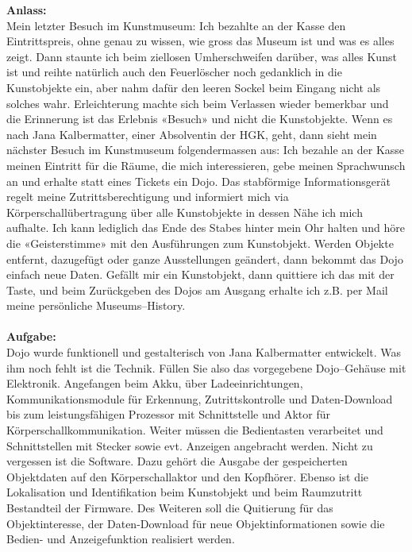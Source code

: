 \documentclass[10pt,a4paper,oneside]{99_fhnwreport}
\begin{document}
\textbf{Anlass:}\\
Mein letzter Besuch im Kunstmuseum: Ich bezahlte an der Kasse den
Eintrittspreis, ohne genau zu wissen, wie gross das Museum ist und was es alles zeigt. Dann
staunte ich beim ziellosen Umherschweifen darüber, was alles Kunst ist und reihte natürlich
auch den Feuerlöscher noch gedanklich in die Kunstobjekte ein, aber nahm dafür den leeren
Sockel beim Eingang nicht als solches wahr. Erleichterung machte sich beim Verlassen wieder
bemerkbar und die Erinnerung ist das Erlebnis «Besuch» und nicht die Kunstobjekte.
Wenn es nach Jana Kalbermatter, einer Absolventin der HGK, geht, dann sieht mein nächster
Besuch im Kunstmuseum folgendermassen aus: Ich bezahle an der Kasse meinen Eintritt für
die Räume, die mich interessieren, gebe meinen Sprachwunsch an und erhalte statt eines
Tickets ein Dojo. Das stabförmige Informationsgerät regelt meine Zutrittsberechtigung und
informiert mich via Körperschallübertragung über alle Kunstobjekte in dessen Nähe ich mich
aufhalte. Ich kann lediglich das Ende des Stabes hinter mein Ohr halten und höre die
«Geisterstimme» mit den Ausführungen zum Kunstobjekt. Werden Objekte entfernt, dazugefügt
oder ganze Ausstellungen geändert, dann bekommt das Dojo einfach neue Daten. Gefällt mir
ein Kunstobjekt, dann quittiere ich das mit der Taste, und beim Zurückgeben des Dojos am
Ausgang erhalte ich z.B. per Mail meine persönliche Museums–History.\\
\\
\textbf{Aufgabe:}\\
Dojo wurde funktionell und gestalterisch von Jana Kalbermatter entwickelt. Was
ihm noch fehlt ist die Technik. Füllen Sie also das vorgegebene Dojo–Gehäuse mit Elektronik.
Angefangen beim Akku, über Ladeeinrichtungen, Kommunikationsmodule für Erkennung,
Zutrittskontrolle und Daten-Download bis zum leistungsfähigen Prozessor mit Schnittstelle und
Aktor für Körperschallkommunikation. Weiter müssen die Bedientasten verarbeitet und
Schnittstellen mit Stecker sowie evt. Anzeigen angebracht werden. Nicht zu vergessen ist die
Software. Dazu gehört die Ausgabe der gespeicherten Objektdaten auf den Körperschallaktor
und den Kopfhörer. Ebenso ist die Lokalisation und Identifikation beim Kunstobjekt und beim Raumzutritt
Bestandteil der Firmware. Des Weiteren soll die Quitierung für das Objektinteresse, der Daten-Download für neue Objektinformationen sowie die Bedien- und Anzeigefunktion realisiert werden.\cite{PFLVOR}
\newline

\end{document}
